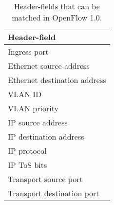 \begin{table}
  \centering
  \begin{tabular}{l}
    \hline
     \textbf{Header-field} \\
    \hline
     Ingress port \\

     Ethernet source address \\
     Ethernet destination address \\

     VLAN ID \\
     VLAN priority \\

     IP source address \\
     IP destination address \\
     IP protocol \\
     IP \ac{ToS} bits \\

     Transport source port \\
     Transport destination port \\
    \hline
  \end{tabular}
  \caption{Header-fields that can be matched in OpenFlow 1.0.}
  \label{table:openflow-1.0.headers}
\end{table}

